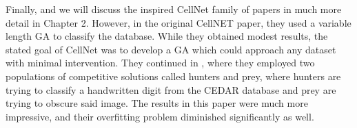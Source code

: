 Finally, and we will discuss the  inspired CellNet family of papers in much more detail in Chapter 2.  However, in the original \cite{kharma_project_2004} CellNET paper, they used a variable length GA to classify the \cite{cedar_cedar_2002} database.  While they obtained modest results, the stated goal of CellNet was to develop a GA which could approach any dataset with minimal intervention.  They continued in \cite{kowaliw_cellnet_2004}, where they employed two populations of competitive solutions called hunters and prey, where hunters are trying to classify a handwritten digit from the CEDAR database and prey are trying to obscure said image.  The results in this paper were much more impressive, and their overfitting problem diminished significantly as well.
\pagebreak
